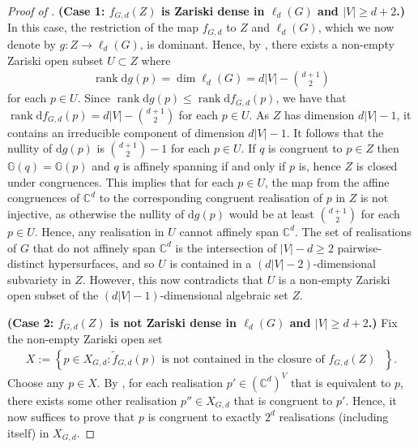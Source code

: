 \documentclass[11pt]{article}
\theoremstyle{definition}
\numberwithin{equation}{section}
\DeclareMathOperator{\rank}{rank}
\newcommand{\diff}{\mathrm{d}}
\begin{document}
\begin{proof}[Proof of ]
	\textbf{(Case 1: $f_{G,d}(Z)$ is Zariski dense in $\ell_d(G)$ and $|V| \geq d+2$.)}
	In this case,
	the restriction of the map $f_{G,d}$ to $Z$ and $\ell_d(G)$, which we now denote by $g : Z \rightarrow \ell_d(G)$, is dominant.
	Hence, by ,
	there exists a non-empty Zariski open subset $U \subset Z$ where 
	\begin{align*}
		\rank \diff g(p) = \dim \ell_d(G) = d|V|- \binom{d+1}{2}
	\end{align*}
	for each $p \in U$.
	Since $\rank \diff g(p) \leq \rank \diff f_{G,d}(p)$,
	we have that $\rank \diff f_{G,d}(p) = d|V| - \binom{d+1}{2}$ for each $p \in U$.
	As $Z$ has dimension $d|V|-1$,
	it contains an irreducible component of dimension $d|V|-1$.
	It follows that the nullity of $\diff g(p)$ is $\binom{d+1}{2} - 1$ for each $p \in U$.	
	If $q$ is congruent to $p \in Z$ then $\mathbb{G}(q) = \mathbb{G}(p)$ and $q$ is affinely spanning if and only if $p$ is,
	hence $Z$ is closed under congruences.
	This implies that for each $p \in U$,
	the map from the affine congruences of $\mathbb{C}^d$ to the corresponding congruent realisation of $p$ in $Z$ is not injective,
	as otherwise the nullity of $\diff g(p)$ would be at least $\binom{d+1}{2}$ for each $p \in U$.
	Hence, any realisation in $U$ cannot affinely span $\mathbb{C}^d$.
	The set of realisations of $G$ that do not affinely span $\mathbb{C}^d$ is the intersection of $|V| - d \geq 2$ pairwise-distinct hypersurfaces,
	and so $U$ is contained in a $(d|V|-2)$-dimensional subvariety in $Z$.
	However, this now contradicts that $U$ is a non-empty Zariski open subset of the $(d|V|-1)$-dimensional algebraic set $Z$.
	
	
	\textbf{(Case 2: $f_{G,d}(Z)$ is not Zariski dense in $\ell_d(G)$ and $|V| \geq d+2$.)}
	Fix the non-empty Zariski open set
	\begin{align*}
		X := \left\{ p \in X_{G,d} : \tilde{f}_{G,d}(p) \text{ is not contained in the closure of $f_{G,d}(Z)$ }   \right\}.
	\end{align*}
	Choose any $p \in X$.
	By , for each realisation $p' \in (\mathbb{C}^d)^V$ that is equivalent to $p$,
	there exists some other realisation $p'' \in X_{G,d}$ that is congruent to $p'$.
	Hence, it now suffices to prove that $p$ is congruent to exactly $2^d$ realisations (including itself) in $X_{G,d}$.
	

\end{proof}
\end{document}
